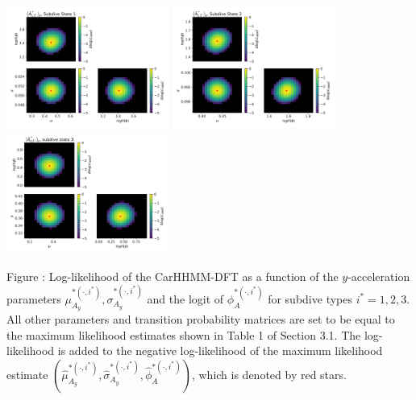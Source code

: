 \documentclass{article}
\begin{document}
        
        \begin{center}
        \includegraphics[width=2.1in]{../Plots/2019/20190902-182840-CATs_OB_1_0_267_CarHHMM2_fine-theta-likelihood-Ay-0.png}
        \includegraphics[width=2.1in]{../Plots/2019/20190902-182840-CATs_OB_1_0_267_CarHHMM2_fine-theta-likelihood-Ay-1.png}
        \includegraphics[width=2.1in]{../Plots/2019/20190902-182840-CATs_OB_1_0_267_CarHHMM2_fine-theta-likelihood-Ay-2.png}
        \end{center}
        
        \noindent Figure : Log-likelihood of the CarHHMM-DFT as a function of the $y$-acceleration parameters $\mu_{A_y}^{*(\cdot,i^*)}, \sigma_{A_y}^{*(\cdot,i^*)}$ and the logit of $\phi_{A}^{*(\cdot,i^*)}$ for subdive types $i^* = 1,2,3$. All other parameters and transition probability matrices are set to be equal to the maximum likelihood estimates shown in Table 1 of Section 3.1. The log-likelihood is added to the negative log-likelihood of the maximum likelihood estimate $(\hat \mu_{A_y}^{*(\cdot,i^*)}, \hat \sigma_{A_y}^{*(\cdot,i^*)}, \hat \phi_{A}^{*(\cdot,i^*)})$, which is denoted by red stars.
        \addtocounter{fignum}{1}
        
\end{document}
